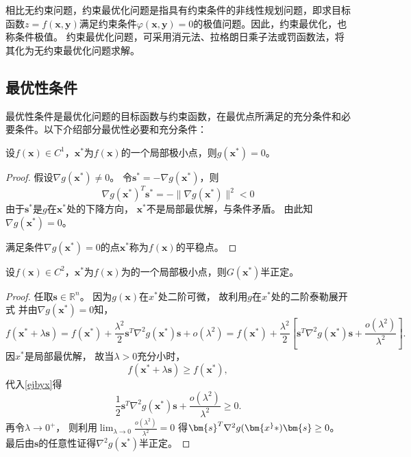     相比无约束问题，约束最优化问题是指具有约束条件的非线性规划问题，即求目标函数$z = f(\bm{x},\bm{y})$满足约束条件$\varphi(\bm{x},\bm{y}) = 0$的极值问题。因此，约束最优化，也称条件极值。
约束最优化问题，可采用消元法、拉格朗日乘子法或罚函数法，将其化为无约束最优化问题求解。

\subsection{最优性条件}
    最优性条件\cite{Book1}是最优化问题的目标函数与约束函数，在最优点所满足的充分条件和必要条件。以下介绍部分最优性必要和充分条件：
    \begin{theorem}[一阶必要条件]
        设$f(\bm{x})\in C^1$，$\bm{x}^*$为$f(\bm{x})$的一个局部极小点，则$g(\bm{x}^*)=0$。
    \end{theorem}
    \begin{proof}
        假设$\nabla g(\bm{x}^*)\neq0$。
        令$\bm{s}^* = -\nabla g(\bm{x}^*)$，则
        \begin{equation*}
            \nabla g(\bm{x}^*)^T\bm{s}^* = - \|\nabla g(\bm{x}^*)\|^2 < 0
        \end{equation*}
        由于$\bm{s}^*$是$g$在$\bm{x}^*$处的下降方向，
        $\bm{x}^*$不是局部最优解，与条件矛盾。
        由此知$\nabla g(\bm{x}^*)=0$。

        满足条件$\nabla g(\bm{x}^*)=0$的点$\bm{x}^*$称为$f(\bm{x})$的平稳点。
    \end{proof}

    \begin{theorem}[二阶必要条件]
        设$f(\bm{x})\in C^2$，$\bm{x}^*$为$f(\bm{x})$为的一个局部极小点，则$G(\bm{x}^*)$半正定。
    \end{theorem}
    \begin{proof}
        任取$\bm{s}\in \mathbb{R}^n$。
        因为$g(\bm{x})$在$x^*$处二阶可微，
        故利用$g$在$x^*$处的二阶泰勒展开式
        并由$\nabla g(\bm{x}^*)=0$知，
        \begin{equation}
            f(\bm{x}^*+\lambda\bm{s}) = 
            f(\bm{x}^*) + \displaystyle\frac{\lambda^2}{2}\bm{s}^T\nabla^2g(\bm{x}^*)\bm{s} + o(\lambda^2) = 
            f(\bm{x}^*) + \displaystyle\frac{\lambda^2}{2}\left[\bm{s}^T\nabla^2g(\bm{x}^*)\bm{s} + \displaystyle\frac{o(\lambda^2)}{\lambda^2}\right] .
            \label{ejbyx}
        \end{equation}
        因$x^*$是局部最优解，
        故当$\lambda>0$充分小时，
        \begin{equation*}
            f(\bm{x}^*+\lambda\bm{s}) \geq 
            f(\bm{x}^*) ,
        \end{equation*}
        代入\ref{ejbyx}得
        \begin{equation*}
            \displaystyle\frac{1}{2}\bm{s}^T\nabla^2g(\bm{x}^*)\bm{s} + \displaystyle\frac{o(\lambda^2)}{\lambda^2} \geq 0 .
        \end{equation*}
        再令$\lambda\to0^+$，
        则利用$\displaystyle\lim_{\lambda\to0}\frac{o(\lambda^2)}{\lambda^2} = 0$
        得$\bm{s}^T\nabla^2g(\bm{x^}*)\bm{s} \geq 0$。
        最后由$\bm{s}$的任意性证得$\nabla^2g(\bm{x}^*)$半正定。
    \end{proof}

